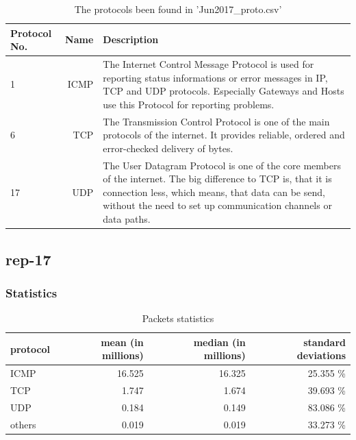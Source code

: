 \begin{table}[H]
\center
\begin{tabular}{lrp{5cm}}
\toprule
	Protocol No. & Name & Description \\
\midrule
	1 & ICMP & The Internet Control Message Protocol is used for reporting status informations or error messages in IP, TCP and UDP protocols. Especially Gateways and Hosts use this Protocol for reporting problems. \tablefootnote{\url{https://www.itwissen.info/ICMP-Internet-control-message-protocol-ICMP-Protokoll.html}}\\
	6 & TCP & The Transmission Control Protocol is one of the main protocols of the internet. It provides reliable, ordered and error-checked delivery of bytes. \tablefootnote{\url{https://en.wikipedia.org/wiki/Transmission_Control_Protocol}} \\
	17 & UDP & The User Datagram Protocol is one of the core members of the internet. The big difference to TCP is, that it is connection less, which means, that data can be send, without the need to set up communication channels or data paths. \tablefootnote{\url{https://en.wikipedia.org/wiki/User_Datagram_Protocol
}}\\
\bottomrule
\end{tabular}
\caption{ The protocols been found in 'Jun2017\_proto.csv' }
\label{tab:proto}
\end{table}

\subsection*{rep-17}
\subsubsection*{Statistics}
\begin{table}[H]
\center
\begin{tabular}{lrrr}
\toprule
protocol & mean (in millions) & median (in millions) & standard deviations \\
\midrule
ICMP &   16.525  &  16.325  &  25.355 \% \\
TCP &     1.747  &   1.674  &  39.693 \% \\
UDP &     0.184  &   0.149  &  83.086 \% \\
others &  0.019  &   0.019  &  33.273 \% \\
\bottomrule
\end{tabular}
\caption{ Packets statistics }
\label{tab:proto-stats-packets}
\end{table}

